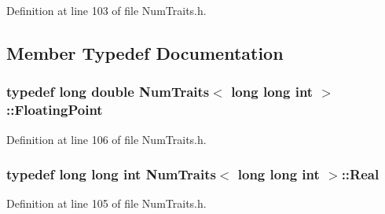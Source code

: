 Definition at line 103 of file Num\-Traits.\-h.



\subsection{Member Typedef Documentation}
\hypertarget{struct_num_traits_3_01long_01long_01int_01_4_a314101669aef44a808c642110036d7f7}{
\subsubsection[{Floating\-Point}]{\setlength{\rightskip}{0pt plus 5cm}typedef {\bf long} {\bf double} {\bf Num\-Traits}$<$ {\bf long} {\bf long} {\bf int} $>$\-::{\bf Floating\-Point}}}\label{struct_num_traits_3_01long_01long_01int_01_4_a314101669aef44a808c642110036d7f7}


Definition at line 106 of file Num\-Traits.\-h.

\hypertarget{struct_num_traits_3_01long_01long_01int_01_4_a499098f0bd884cf47d38c364a0f11e36}{
\subsubsection[{Real}]{\setlength{\rightskip}{0pt plus 5cm}typedef {\bf long} {\bf long} {\bf int} {\bf Num\-Traits}$<$ {\bf long} {\bf long} {\bf int} $>$\-::{\bf Real}}}\label{struct_num_traits_3_01long_01long_01int_01_4_a499098f0bd884cf47d38c364a0f11e36}


Definition at line 105 of file Num\-Traits.\-h.



